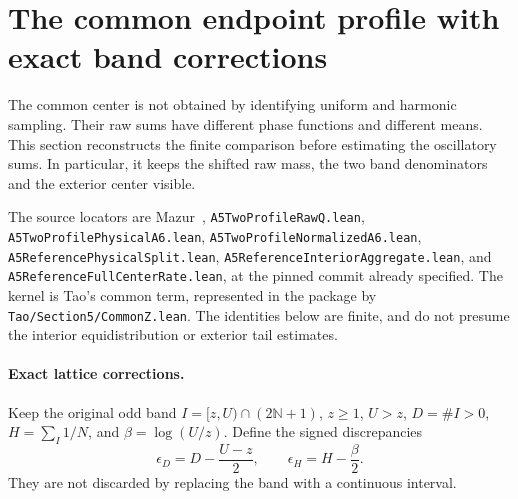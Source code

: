 \documentclass[11pt]{article}
\theoremstyle{remark}\newtheorem{remark}[proposition]{Remark}
\begin{document}
\section{The common endpoint profile with exact band corrections}
\label{sec:mazur-common-profile}

The common center is not obtained by identifying uniform and harmonic
sampling. Their raw sums have different phase functions and different
means. This section reconstructs the finite comparison before estimating
the oscillatory sums. In particular, it keeps the shifted raw mass,
the two band denominators and the exterior center visible.

The source locators are Mazur~\cite{Mazur2026v2},
\texttt{A5TwoProfileRawQ.lean}, \texttt{A5TwoProfilePhysicalA6.lean},
\texttt{A5TwoProfileNormalizedA6.lean},
\texttt{A5ReferencePhysicalSplit.lean},
\texttt{A5ReferenceInteriorAggregate.lean}, and
\texttt{A5ReferenceFullCenterRate.lean}, at the pinned commit already
specified. The kernel is Tao's common term, represented in the package
by \texttt{Tao/Section5/CommonZ.lean}. The identities below are finite,
and do not presume the interior equidistribution or exterior tail estimates.

\paragraph{Exact lattice corrections.}
Keep the original odd band $I=[z,U)\cap(2\mathbb N+1)$,
$z\ge1$, $U>z$, $D=\#I>0$, $H=\sum_I1/N$,
and $\beta=\log(U/z)$. Define the signed discrepancies
\[
 \epsilon_D=D-\frac{U-z}{2},\qquad
 \epsilon_H=H-\frac{\beta}{2}.
\]
They are not discarded by replacing the band with a continuous interval.
\end{document}

